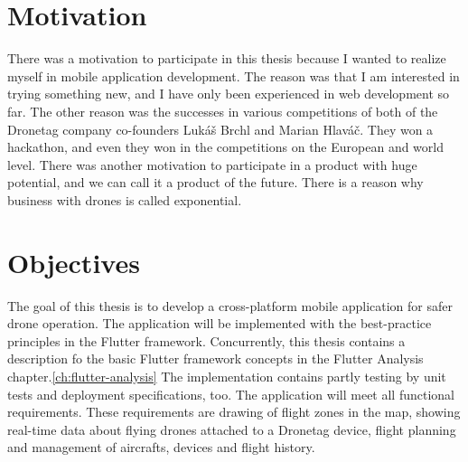 \section{Motivation}\label{sec:motivation}
There was a motivation to participate in this thesis because I wanted to realize myself in mobile application development. %
The reason was that I am interested in trying something new, and I have only been experienced in web development so far. %
The other reason was the successes in various competitions of both of the Dronetag company co-founders Luk{\' a}{\v s} Brchl and Marian Hlav{\' a}{\v c}. %
They won a hackathon, and even they won in the competitions on the European and world level. %
There was another motivation to participate in a product with huge potential, and we can call it a product of the future. %
There is a reason why business with drones is called exponential.


\section{Objectives}\label{sec:objectives}
The goal of this thesis is to develop a cross-platform mobile application for safer drone operation.
The application will be implemented with the best-practice principles in the Flutter framework.
Concurrently, this thesis contains a description fo the basic Flutter framework concepts in the Flutter Analysis chapter.\ref{ch:flutter-analysis}
The implementation contains partly testing by unit tests and deployment specifications, too.
The application will meet all functional requirements. %
These requirements are drawing of flight zones in the map, showing real-time data about flying drones attached to a Dronetag device, flight planning and management of aircrafts, devices and flight history.
